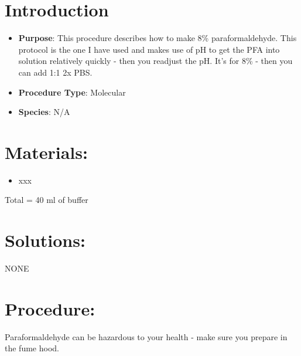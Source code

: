 \documentclass[
  letterpaper,
  DIV=11,
  numbers=noendperiod]{scrreprt}
\providecommand{\tightlist}{%
  \setlength{\itemsep}{0pt}\setlength{\parskip}{0pt}}\usepackage{longtable,booktabs,array}
\begin{document}
\hypertarget{introduction-14}{%
\section{Introduction}\label{introduction-14}}

\begin{itemize}
\tightlist
\item
  \textbf{Purpose}: This procedure describes how to make 8\%
  paraformaldehyde. This protocol is the one I have used and makes use
  of pH to get the PFA into solution relatively quickly - then you
  readjust the pH. It's for 8\% - then you can add 1:1 2x PBS.
\item
  \textbf{Procedure Type}: Molecular
\item
  \textbf{Species}: N/A
\end{itemize}

\hypertarget{materials-14}{%
\section{Materials:}\label{materials-14}}

\begin{itemize}
\tightlist
\item
  xxx
\end{itemize}

Total = 40 ml of buffer

\hypertarget{solutions-14}{%
\section{Solutions:}\label{solutions-14}}

NONE

\hypertarget{procedure-14}{%
\section{Procedure:}\label{procedure-14}}

\begin{tcolorbox}[enhanced jigsaw, rightrule=.15mm, title=\textcolor{quarto-callout-warning-color}{\faExclamationTriangle}\hspace{0.5em}{HUMAN HEALTH WARNGING}, titlerule=0mm, opacitybacktitle=0.6, toprule=.15mm, bottomrule=.15mm, opacityback=0, left=2mm, colframe=quarto-callout-warning-color-frame, breakable, coltitle=black, colback=white, colbacktitle=quarto-callout-warning-color!10!white, bottomtitle=1mm, leftrule=.75mm, toptitle=1mm, arc=.35mm]

Paraformaldehyde can be hazardous to your health - make sure you prepare
in the fume hood.

\end{tcolorbox}
\end{document}
